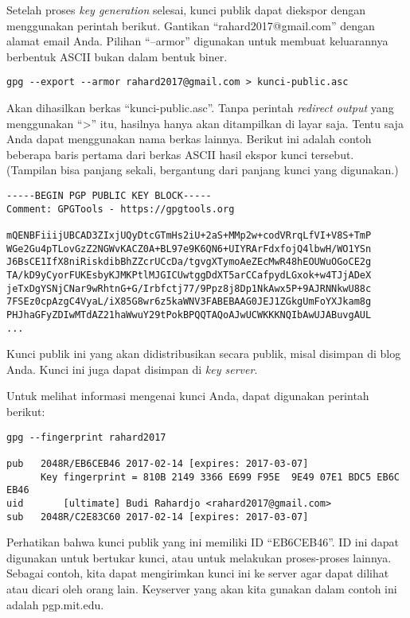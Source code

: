 Setelah proses {\em key generation} selesai, kunci publik dapat diekspor dengan
menggunakan perintah  berikut. Gantikan ``rahard2017@gmail.com'' dengan alamat
email Anda. Pilihan ``--armor'' digunakan untuk membuat keluarannya berbentuk ASCII
bukan dalam bentuk biner.

\begin{verbatim}
gpg --export --armor rahard2017@gmail.com > kunci-public.asc
\end{verbatim}

Akan dihasilkan berkas ``kunci-public.asc''. Tanpa perintah {\em redirect
output} yang menggunakan ``>'' itu, hasilnya hanya akan ditampilkan di layar
saja. Tentu saja Anda dapat menggunakan nama berkas lainnya.
Berikut ini adalah contoh beberapa baris pertama dari berkas ASCII hasil ekspor
kunci tersebut. (Tampilan bisa panjang sekali, bergantung dari panjang kunci
yang digunakan.)

\begin{verbatim}
-----BEGIN PGP PUBLIC KEY BLOCK-----
Comment: GPGTools - https://gpgtools.org

mQENBFiiijUBCAD3ZIxjUQyDtcGTmHs2iU+2aS+MMp2w+codVRrqLfVI+V8S+TmP
WGe2Gu4pTLovGzZ2NGWvKACZ0A+BL97e9K6QN6+UIYRArFdxfojQ4lbwH/WO1YSn
J6BsCE1IfX8niRiskdibBhZZcrUCcDa/tgvgXTymoAeZEcMwR48hEOUWuOGoCE2g
TA/kD9yCyorFUKEsbyKJMKPtlMJGICUwtggDdXT5arCCafpydLGxok+w4TJjADeX
jeTxDgYSNjCNar9wRhtnG+G/Irbfctj77/9Ppz8j8Dp1NkAwx5P+9AJRNNkwU88c
7FSEz0cpAzgC4VyaL/iX85G8wr6z5kaWNV3FABEBAAG0JEJ1ZGkgUmFoYXJkam8g
PHJhaGFyZDIwMTdAZ21haWwuY29tPokBPQQTAQoAJwUCWKKKNQIbAwUJABuvgAUL
...
\end{verbatim}

Kunci publik ini yang akan didistribusikan secara publik, misal disimpan di
blog Anda. Kunci ini juga dapat disimpan di {\em key server}.

Untuk melihat informasi mengenai kunci Anda, dapat digunakan perintah berikut:

\begin{verbatim}
gpg --fingerprint rahard2017

pub   2048R/EB6CEB46 2017-02-14 [expires: 2017-03-07]
      Key fingerprint = 810B 2149 3366 E699 F95E  9E49 07E1 BDC5 EB6C EB46
uid       [ultimate] Budi Rahardjo <rahard2017@gmail.com>
sub   2048R/C2E83C60 2017-02-14 [expires: 2017-03-07]
\end{verbatim}

Perhatikan bahwa kunci publik yang ini memiliki ID ``EB6CEB46''. ID ini dapat
digunakan untuk bertukar kunci, atau untuk melakukan proses-proses lainnya.
Sebagai contoh, kita dapat mengirimkan kunci ini ke server agar dapat dilihat
atau dicari oleh orang lain. Keyserver yang akan kita gunakan dalam contoh ini
adalah pgp.mit.edu.

